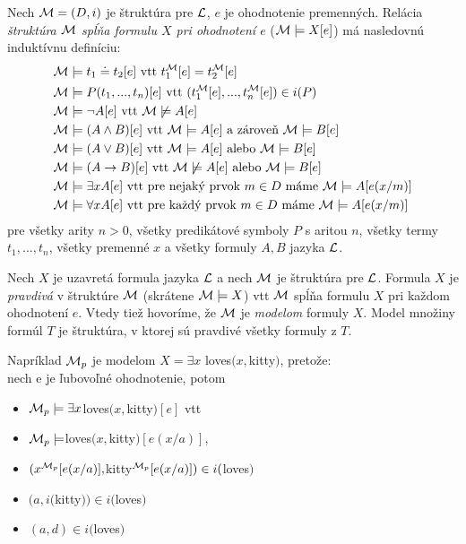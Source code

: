 Nech $\mathcal{M} = (D, i)$ je štruktúra pre $\mathcal{L}$, $e$ je ohodnotenie premenných. Relácia \emph{štruktúra $\mathcal{M}$ spĺňa formulu $X$ pri ohodnotení $e$} ($\mathcal{M} \models X[e]$) má nasledovnú induktívnu definíciu:
\begin{align*}
&\mathcal{M} \models t_1 \doteq t_2 [e] \text{ vtt } t_1^{\mathcal{M}} [e] = t_2^{\mathcal{M}} [e] \\
&\mathcal{M} \models P(t_1, ..., t_n) [e] \text{ vtt } (t_1^{\mathcal{M}} [e], ..., t_n^{\mathcal{M}} [e]) \in i(P) \\
&\mathcal{M} \models \neg A [e] \text{ vtt } \mathcal{M} \not\models A [e] \\
&\mathcal{M} \models (A \land B) [e] \text{ vtt } \mathcal{M} \models A [e] \text{ a zároveň } \mathcal{M} \models B [e] \\
&\mathcal{M} \models (A \lor B) [e] \text{ vtt } \mathcal{M} \models A [e] \text{ alebo } \mathcal{M} \models B [e] \\
&\mathcal{M} \models (A \to B) [e] \text{ vtt } \mathcal{M} \not\models A [e] \text{ alebo } \mathcal{M} \models B [e] \\
&\mathcal{M} \models \exists x A [e] \text{ vtt pre nejaký prvok } m \in D \text{ máme } \mathcal{M} \models A [e(x/m)] \\
&\mathcal{M} \models \forall x A [e] \text{ vtt pre každý prvok } m \in D \text{ máme } \mathcal{M} \models A [e(x/m)]
\end{align*}
pre všetky arity $n > 0$, všetky predikátové symboly $P$ s aritou $n$, všetky termy $t_1, ..., t_n$, všetky premenné $x$ a všetky formuly $A, B$ jazyka $\mathcal{L}$.

Nech $X$ je uzavretá formula jazyka $\mathcal{L}$ a nech $\mathcal{M}$ je štruktúra pre $\mathcal{L}$. Formula $X$ je \emph{pravdivá} v štruktúre $\mathcal{M}$ (skrátene $\mathcal{M} \models X$) vtt $\mathcal{M}$ spĺňa formulu $X$ pri každom ohodnotení $e$. Vtedy tiež hovoríme, že $\mathcal{M}$ je \emph{modelom} formuly $X$.
Model množiny formúl $T$ je štruktúra, v ktorej sú pravdivé všetky formuly z $T$.

Napríklad  $\mathcal{M}_p$ je modelom $X = \exists x $ loves$(x, $kitty$)$, pretože:\\
nech e je ľubovoľné ohodnotenie, potom
\begin{itemize}
\item $\mathcal{M}_p \models \exists x $loves$(x, $kitty$)[e]$ vtt
\item $\mathcal{M}_p \models $loves$(x, $kitty$)[e(x/a)]$, 
\item $(x^{\mathcal{M}_p}[e(x/a)], $kitty$^{\mathcal{M}_p}[e(x/a)]) \in i($loves$)$
\item $(a, i($kitty$)) \in i($loves$)$
\item $(a, d) \in i($loves$)$
\end{itemize}

